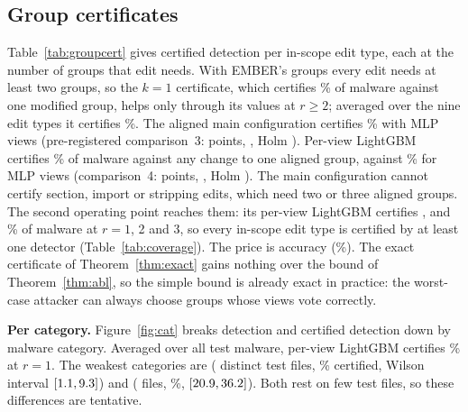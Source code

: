 \subsection{Group certificates}\label{sec:groupres}
Table~\ref{tab:groupcert} gives certified detection per in-scope edit type, each at the number of groups that edit needs. With EMBER's groups every edit needs at least two groups, so the $k=1$ certificate, which certifies \ResEmberROne\% of malware against one modified group, helps only through its values at $r\ge2$; averaged over the nine edit types it certifies \FamCertEditsEmber\%. The aligned main configuration certifies \FamCertEditsAblMain\% with MLP views (pre-registered comparison~3: \CmpCDiff{} points, \CmpCInt, Holm \CmpCPeq). %
Per-view LightGBM certifies \FamCertROneLgbmViews\% of malware against any change to one aligned group, against \FamCertROneAblMain\% for MLP views (comparison~4: \CmpDDiff{} points, \CmpDInt, Holm \CmpDPeq). %
The main configuration cannot certify section, import or stripping edits, which need two or three aligned groups. The second operating point reaches them: its per-view LightGBM certifies \ResCertLgbmSecondROne, \ResCertLgbmSecondRTwo{} and \ResCertLgbmSecondRThree\% of malware at $r=1$, 2 and 3, so every in-scope edit type is certified by at least one detector (Table~\ref{tab:coverage}). The price is accuracy (\ResAccLgbmSecond\%). %
The exact certificate of Theorem~\ref{thm:exact} gains nothing over the bound of Theorem~\ref{thm:abl}, so the simple bound is already exact in practice: the worst-case attacker can always choose groups whose views vote correctly. %

\textbf{Per category.} Figure~\ref{fig:cat} breaks detection and certified detection down by malware category. Averaged over all test malware, per-view LightGBM certifies \ResCatAllCert\% at $r=1$. The weakest categories are \ResCatWeakA{} (\ResCatWeakAN{} distinct test files, \ResCatWeakACert\% certified, Wilson interval $[1.1,9.3]$) and \ResCatWeakB{} (\ResCatWeakBN{} files, \ResCatWeakBCert\%, $[20.9,36.2]$). Both rest on few test files, so these differences are tentative. %

\begin{table}[!htbp]
\centering\small
\caption{Certified detection (\%) of test malware per in-scope edit type, at the number of groups $r$ the edit needs in each grouping; 0.0 where the edit needs more groups than the configuration can certify. Last rows: mean over the nine types ($\pm$: 95\% half-width), clean accuracy, number of views and largest certifiable $r$.}\label{tab:groupcert}
\resizebox{\textwidth}{!}{}
\end{table}

